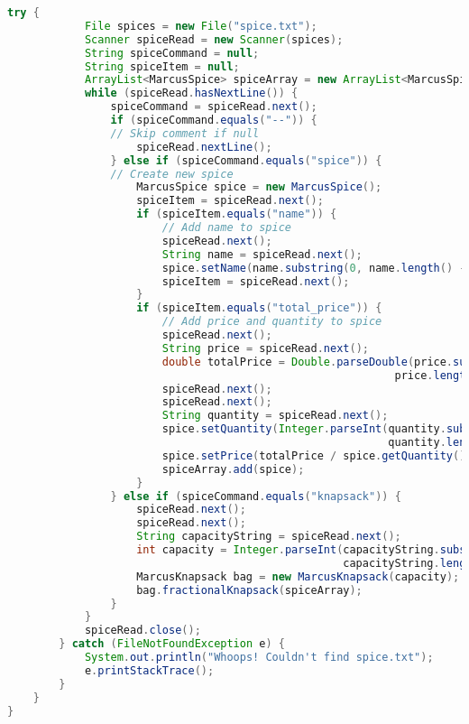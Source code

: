 \documentclass[letterpaper, 10pt]{article}
\begin{document}
\begin{lstlisting}[language=Java]
        try {
            File spices = new File("spice.txt");
            Scanner spiceRead = new Scanner(spices);
            String spiceCommand = null;
            String spiceItem = null;
            ArrayList<MarcusSpice> spiceArray = new ArrayList<MarcusSpice>();
            while (spiceRead.hasNextLine()) {
                spiceCommand = spiceRead.next();
                if (spiceCommand.equals("--")) {
                // Skip comment if null
                    spiceRead.nextLine();
                } else if (spiceCommand.equals("spice")) {
                // Create new spice
                    MarcusSpice spice = new MarcusSpice();
                    spiceItem = spiceRead.next();
                    if (spiceItem.equals("name")) {
                        // Add name to spice
                        spiceRead.next();
                        String name = spiceRead.next();
                        spice.setName(name.substring(0, name.length() - 1));
                        spiceItem = spiceRead.next();
                    }
                    if (spiceItem.equals("total_price")) {
                        // Add price and quantity to spice
                        spiceRead.next();
                        String price = spiceRead.next();
                        double totalPrice = Double.parseDouble(price.substring(0,
                                                            price.length() - 1));
                        spiceRead.next();
                        spiceRead.next();
                        String quantity = spiceRead.next();
                        spice.setQuantity(Integer.parseInt(quantity.substring(0,
                                                           quantity.length() - 1)));
                        spice.setPrice(totalPrice / spice.getQuantity());
                        spiceArray.add(spice);
                    }
                } else if (spiceCommand.equals("knapsack")) {
                    spiceRead.next();
                    spiceRead.next();
                    String capacityString = spiceRead.next();
                    int capacity = Integer.parseInt(capacityString.substring(0, 
                                                    capacityString.length() - 1));
                    MarcusKnapsack bag = new MarcusKnapsack(capacity);
                    bag.fractionalKnapsack(spiceArray);
                }
            }
            spiceRead.close();
        } catch (FileNotFoundException e) {
            System.out.println("Whoops! Couldn't find spice.txt");
            e.printStackTrace();
        }
    }
}
\end{lstlisting}
\end{document}

